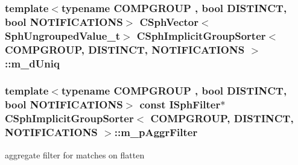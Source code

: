 \hypertarget{classCSphImplicitGroupSorter_a432280b67b6af6981ec97812b1b62650}{
\subsubsection[{m\-\_\-d\-Uniq}]{\setlength{\rightskip}{0pt plus 5cm}template$<$typename C\-O\-M\-P\-G\-R\-O\-U\-P , bool D\-I\-S\-T\-I\-N\-C\-T, bool N\-O\-T\-I\-F\-I\-C\-A\-T\-I\-O\-N\-S$>$ {\bf C\-Sph\-Vector}$<${\bf Sph\-Ungrouped\-Value\-\_\-t}$>$ {\bf C\-Sph\-Implicit\-Group\-Sorter}$<$ C\-O\-M\-P\-G\-R\-O\-U\-P, D\-I\-S\-T\-I\-N\-C\-T, N\-O\-T\-I\-F\-I\-C\-A\-T\-I\-O\-N\-S $>$\-::m\-\_\-d\-Uniq\hspace{0.3cm}{\ttfamily [protected]}}}\label{classCSphImplicitGroupSorter_a432280b67b6af6981ec97812b1b62650}
\hypertarget{classCSphImplicitGroupSorter_a0c09e454baa15f8a7f514b9a60e9fdac}{
\subsubsection[{m\-\_\-p\-Aggr\-Filter}]{\setlength{\rightskip}{0pt plus 5cm}template$<$typename C\-O\-M\-P\-G\-R\-O\-U\-P , bool D\-I\-S\-T\-I\-N\-C\-T, bool N\-O\-T\-I\-F\-I\-C\-A\-T\-I\-O\-N\-S$>$ const {\bf I\-Sph\-Filter}$\ast$ {\bf C\-Sph\-Implicit\-Group\-Sorter}$<$ C\-O\-M\-P\-G\-R\-O\-U\-P, D\-I\-S\-T\-I\-N\-C\-T, N\-O\-T\-I\-F\-I\-C\-A\-T\-I\-O\-N\-S $>$\-::m\-\_\-p\-Aggr\-Filter\hspace{0.3cm}{\ttfamily [protected]}}}\label{classCSphImplicitGroupSorter_a0c09e454baa15f8a7f514b9a60e9fdac}


aggregate filter for matches on flatten 

